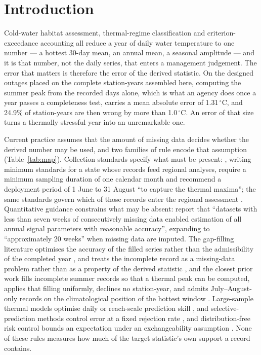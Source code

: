 \documentclass[draft]{agujournal2025}
\begin{document}
\section{Introduction}

Cold-water habitat assessment, thermal-regime classification and
criterion-exceedance accounting \cite{wac2024} all reduce a year of daily water temperature to
one number --- a hottest 30-day mean, an annual mean, a seasonal amplitude
\cite{caissie2006,isaak2017} --- and it is that number, not the daily series,
that enters a management judgement. The error that matters is therefore the
error of the derived statistic. On the designed outages placed on the complete
station-years assembled here, computing the summer peak from the recorded days
alone, which is what an agency
does once a year passes a completeness test, carries a mean absolute error of
1.31\,$^{\circ}$C, and 24.9\% of station-years are then wrong by more than
1.0\,$^{\circ}$C. An error of that size turns a thermally stressful year into an
unremarkable one.

Current practice assumes that the amount of missing data decides whether the
derived number may be used, and two families of rule encode that assumption
(Table~\ref{tab:map}). Collection standards specify what must be present:
, writing minimum standards for a state whose records feed
regional analyses, require a minimum sampling duration of one calendar month and
recommend a deployment period of 1 June to 31 August ``to capture the thermal
maxima''; the same standards govern which of those records enter the regional
assessment \cite{mauger2017}. Quantitative guidance constrains what may be
absent:  report that ``datasets with less than seven weeks of
consecutively missing data enabled estimation of all annual signal parameters
with reasonable accuracy'', expanding to ``approximately 20 weeks'' when missing
data are imputed. The gap-filling literature optimises the accuracy of the
filled series rather than the admissibility of the completed year
\cite{mohseni1998,li2017}, and treats the incomplete record as a missing-data
problem rather than as a property of the derived statistic \cite{rubin1976}, and the closest prior work fills incomplete summer
records so that a thermal peak can be computed, applies that filling uniformly,
declines no station-year, and admits July--August-only records on the
climatological position of the hottest window \cite{beaufort2022}. Large-sample
thermal models optimise daily or reach-scale prediction skill
\cite{isaak2017,corona2025,kratzert2023}, and selective-prediction methods
control error at a fixed rejection rate \cite{geifman2017,zaoui2020}, and
distribution-free risk control bounds an expectation under an exchangeability
assumption \cite{lei2018,angelopoulos2022,bai2026}. None of
these rules measures how much of the target statistic's own support a record
contains.
\end{document}
